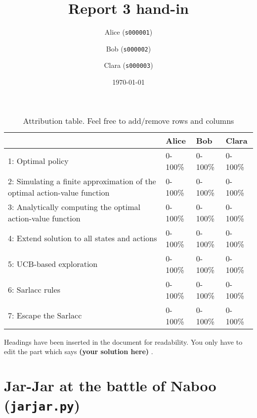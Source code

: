 \documentclass[12pt,twoside]{article}
\title{ Report 3 hand-in }
\date{ \today }
\author{Alice (\texttt{s000001})\and  Bob (\texttt{s000002})\and Clara (\texttt{s000003}) }
\newcommand\redt[1]{ {\textcolor[rgb]{0.60, 0.00, 0.00}{\textbf{ #1} } } }
\newcommand{\yoursolution}{ \redt{(your solution here) } }
\begin{document}
\maketitle

\begin{table}[ht!]
\caption{Attribution table. Feel free to add/remove rows and columns}
\begin{tabular}{llll}
\toprule
                                                                           & Alice   & Bob    & Clara   \\
\midrule
 1: Optimal policy                                                         & 0-100\%  & 0-100\% & 0-100\%  \\
 2: Simulating a finite approximation of the optimal action-value function & 0-100\%  & 0-100\% & 0-100\%  \\
 3: Analytically computing the optimal action-value function               & 0-100\%  & 0-100\% & 0-100\%  \\
 4: Extend solution to all states and actions                              & 0-100\%  & 0-100\% & 0-100\%  \\
 5: UCB-based exploration                                                  & 0-100\%  & 0-100\% & 0-100\%  \\
 6: Sarlacc rules                                                          & 0-100\%  & 0-100\% & 0-100\%  \\
 7: Escape the Sarlacc                                                     & 0-100\%  & 0-100\% & 0-100\%  \\
\bottomrule
\end{tabular}
\end{table}


Headings have been inserted in the document for readability. You only have to edit the part which says \yoursolution. 

\section{Jar-Jar at the battle of Naboo (\texttt{jarjar.py})}
\end{document}
